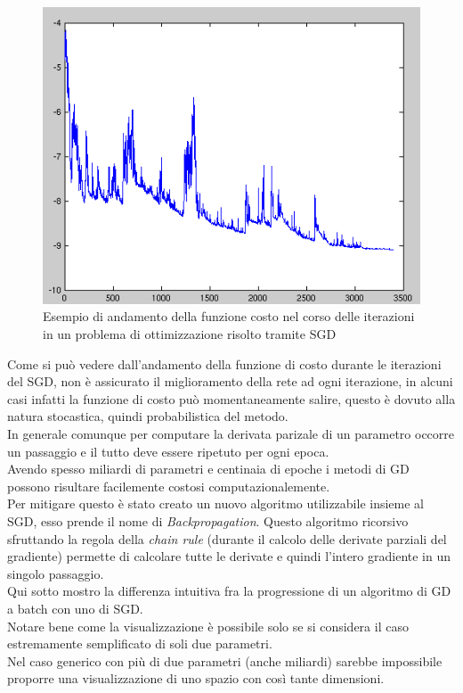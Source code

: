 \documentclass[12pt,a4paper,openright,twoside]{report}
\begin{document}
\begin{figure}[h]
\centering
\includegraphics[width=\linewidth]{Stogra.png}
\caption{Esempio di andamento della funzione costo nel corso delle iterazioni in un problema di ottimizzazione risolto tramite SGD}
\end{figure}
\newpage
Come si può vedere dall'andamento della funzione di costo durante le iterazioni del SGD, non è assicurato il miglioramento della rete ad ogni iterazione, in alcuni casi infatti la funzione di costo può momentaneamente salire, questo è dovuto alla natura stocastica, quindi probabilistica del metodo.\\
In generale comunque per computare la derivata parizale di un parametro occorre un passaggio e il tutto deve essere ripetuto per ogni epoca. \\
Avendo spesso miliardi di parametri e centinaia di epoche i metodi di GD possono risultare facilemente costosi computazionalemente. \\
Per mitigare questo è stato creato un nuovo algoritmo utilizzabile insieme al SGD, esso prende il nome di \emph{Backpropagation}.
Questo algoritmo ricorsivo sfruttando la regola della \emph{chain rule} (durante il calcolo delle derivate parziali del gradiente) permette di calcolare tutte le derivate e quindi l'intero gradiente in un singolo passaggio.\\

Qui sotto mostro la differenza intuitiva fra la progressione di un algoritmo di GD a batch con uno di SGD.\\
Notare bene come la visualizzazione è possibile solo se si considera il caso estremamente semplificato di soli due parametri. \\Nel caso generico con più di due parametri (anche miliardi) sarebbe impossibile proporre una visualizzazione di uno spazio con così tante dimensioni.
\end{document}
